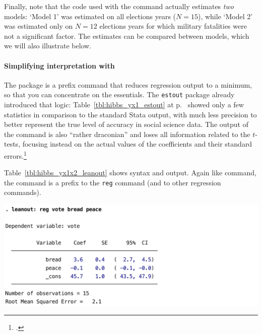Finally, note that the code used with the  command actually estimates \emph{two} models: `Model 1' was estimated on all elections years ($N=15$), while `Model 2' was estimated only on $N=12$ elections years for which military fatalities were not a significant factor. The estimates can be compared between models, which we will also illustrate below.

	
	\paragraph{Simplifying interpretation with }%
	\label{sec:leanout}
	The  package is a prefix command that reduces regression output to a minimum, so that you can concentrate on the essentials. The \texttt{estout} package already introduced that logic: Table~\ref{tbl:hibbs_yx1_estout} at p.~\pageref{tbl:hibbs_yx1_estout} showed only a few statistics in comparison to the standard Stata output, with much less precision to better represent the true level of accuracy in social science data. The output of the  command is also ``rather draconian'' and loses all information related to the $t$-tests, focusing instead on the actual values of the coefficients and their standard errors.\footcite{Beck:2010}

	Table~\ref{tbl:hibbs_yx1x2_leanout} shows  syntax and output. Again like  command, the  command is a prefix to the \texttt{reg} command (and to other regression commands).
	
	\begin{table}[htp]
		\includegraphics[scale=.5]{images/hibbs_yx1x2_leanout.pdf}

	  	\caption[Extract from  output (4): Simplified regression output]{\label{tbl:hibbs_yx1x2_leanout}%
      Extract from  output (4): %
      Simplified regression output using the  prefix. %
      \hibbs}
	\end{table}%
	
